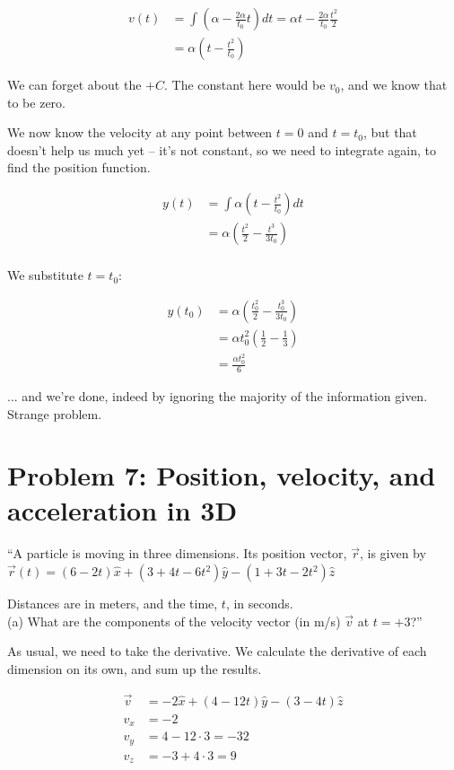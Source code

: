 \documentclass[8.01x]{subfiles}
\begin{document}
\begin{align}
v(t) &= \int \left( \alpha - \frac{2\alpha}{t_0} t \right) dt  = \alpha t - \frac{2\alpha}{t_0} \frac{t^2}{2}\\
     &= \alpha \left( t - \frac{t^2}{t_0} \right)
\end{align}

We can forget about the $+ C$. The constant here would be $v_0$, and we know that to be zero.

We now know the velocity at any point between $t = 0$ and $t = t_0$, but that doesn't help us much yet -- it's not constant, so we need to integrate again, to find the position function.

\begin{align}
y(t) &= \int \alpha \left( t - \frac{t^2}{t_0} \right) dt\\
     &= \alpha\left( \frac{t^2}{2} - \frac{t^3}{3t_0} \right)\\
\end{align}

We substitute $t = t_0$:

\begin{align}
y(t_0) &= \alpha\left( \frac{t_0^2}{2} - \frac{t_0^3}{3t_0} \right)\\
       &= \alpha t_0^2 \left( \frac{1}{2} - \frac{1}{3} \right)\\
       &= \frac{\alpha t_0^2}{6}
\end{align}

... and we're done, indeed by ignoring the majority of the information given. Strange problem.

\section{Problem 7: Position, velocity, and acceleration in 3D}

``A particle is moving in three dimensions. Its position vector, $\vec{r}$, is given by\\
$\vec{r}(t) = (6 - 2t)\hat{x} + (3 + 4t - 6t^2)\hat{y} - (1 + 3t - 2t^2)\hat{z}$

Distances are in meters, and the time, $t$, in seconds.\\
(a) What are the components of the velocity vector (in m/s) $\vec{v}$  at $t = +3$?''

As usual, we need to take the derivative. We calculate the derivative of each dimension on its own, and sum up the results.

\begin{align}
\vec{v} &= -2\hat{x} + (4 - 12t)\hat{y} - (3 - 4t)\hat{z} \label{eq:h1p7_velocity}\\
v_x &= -2\\
v_y &= 4 - 12 \cdot 3 = -32\\
v_z &= -3 + 4 \cdot 3 = 9
\end{align}
\end{document}
